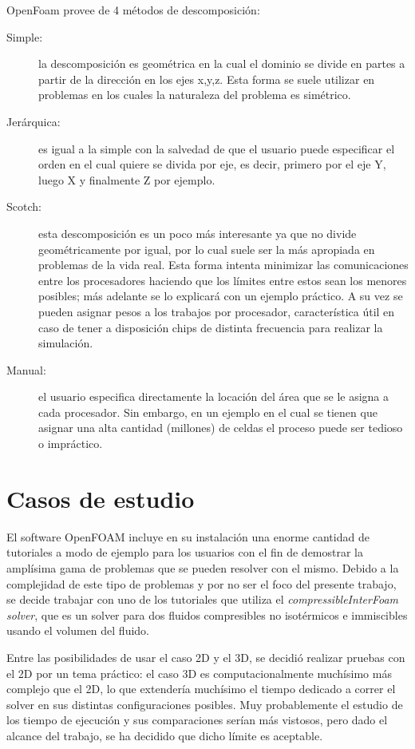 \documentclass{article}
\begin{document}
\begin{description}
        OpenFoam provee de 4 métodos de descomposición:
        \begin{description}
            \item [Simple:] la descomposición es geométrica en la cual el dominio se divide en partes a partir de la dirección en los ejes x,y,z. Esta forma se suele utilizar en problemas en los cuales la naturaleza del problema es simétrico.
            \item [Jerárquica:] es igual a la simple con la salvedad de que el usuario puede especificar el orden en el cual quiere se divida por eje, es decir, primero por el eje Y, luego X y finalmente Z por ejemplo.
            \item [Scotch:] esta descomposición es un poco más interesante ya que no divide geométricamente por igual, por lo cual suele ser la más apropiada en problemas de la vida real. Esta forma intenta minimizar las comunicaciones entre los procesadores haciendo que los límites entre estos sean los menores posibles; más adelante se lo explicará con un ejemplo práctico. A su vez se pueden asignar pesos a los trabajos por procesador, característica útil en caso de tener a disposición chips de distinta frecuencia para realizar la simulación.
            \item [Manual:] el usuario especifica directamente la locación del área que se le asigna a cada procesador. Sin embargo, en un ejemplo en el cual se tienen que asignar una alta cantidad (millones) de celdas el proceso puede ser tedioso o impráctico.
        \end{description}

\end{description}

\newpage
\section{Casos de estudio}
El software OpenFOAM incluye en su instalación una enorme cantidad de tutoriales a modo de ejemplo para los usuarios con el fin de demostrar la amplísima gama de problemas que se pueden resolver con el mismo. Debido a la complejidad de este tipo de problemas y por no ser el foco del presente trabajo, se decide trabajar con uno de los tutoriales que utiliza el \textit{compressibleInterFoam solver}, que es un solver para dos fluidos compresibles no isotérmicos e immiscibles usando el volumen del fluido.

Entre las posibilidades de usar el caso 2D y el 3D, se decidió realizar pruebas con el 2D por un tema práctico: el caso 3D es computacionalmente muchísimo más complejo que el 2D, lo que extendería muchísimo el tiempo dedicado a correr el solver en sus distintas configuraciones posibles. Muy probablemente el estudio de los tiempo de ejecución y sus comparaciones serían más vistosos, pero dado el alcance del trabajo, se ha decidido que dicho límite es aceptable.
\end{document}

